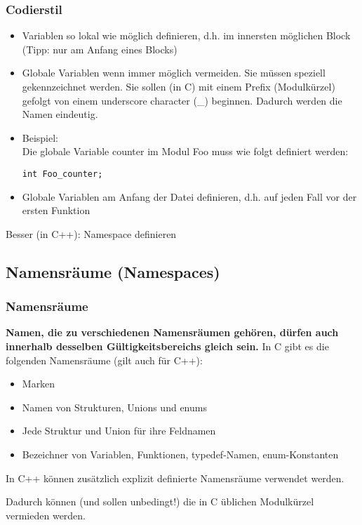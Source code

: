 \subsubsection{Codierstil\hfill}
\label{sec:Codierstil}
\begin{itemize}
	\item Variablen so lokal wie möglich definieren, d.h. im innersten möglichen Block (Tipp: nur am Anfang eines Blocks)
	\item Globale Variablen wenn immer möglich vermeiden. Sie müssen speziell gekennzeichnet werden. Sie sollen (in C) mit einem Prefix (Modulkürzel) gefolgt von einem underscore character (\_) beginnen. Dadurch werden die Namen eindeutig.
	\item[\-] Beispiel:\\Die globale Variable counter im Modul Foo muss wie folgt definiert werden:
	\noindent
\begin{minipage}{\linewidth}
\begin{lstlisting}
int Foo_counter;
\end{lstlisting}
\end{minipage}
	\item Globale Variablen am Anfang der Datei definieren, d.h. auf jeden Fall vor der ersten Funktion
\end{itemize}
\begin{hinweis}
Besser (in C++): Namespace definieren
\end{hinweis}


\subsection{Namensräume (Namespaces)\hfill}
\label{sec:Namensraeume (Namespaces)}

\subsubsection{Namensräume\hfill}
\label{sec:Namensraeume}
\textbf{Namen, die zu verschiedenen Namensräumen gehören, dürfen auch innerhalb desselben Gültigkeitsbereichs gleich sein.}
In C gibt es die folgenden Namensräume (gilt auch für C++):
\begin{itemize}
	\item Marken
	\item Namen von Strukturen, Unions und enums
	\item Jede Struktur und Union für ihre Feldnamen
	\item Bezeichner von Variablen, Funktionen, typedef-Namen, enum-Konstanten
\end{itemize}
In C++ können zusätzlich explizit definierte Namensräume verwendet werden.\\
\begin{hinweis}
Dadurch können (und sollen unbedingt!) die in C üblichen Modulkürzel vermieden werden.
\end{hinweis}

